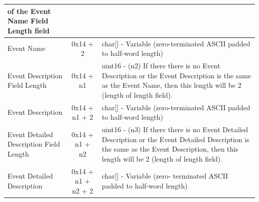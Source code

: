 \documentclass[14]{article}
\begin{document}
\begin{tabular}[l]{|p{5cm}|c|p{7cm}|}
                                   of the Event Name Field Length field \\
  \hline
  Event Name & 0x14 + 2 & char[] - Variable (zero-terminated ASCII padded to
                          half-word length) \\
  \hline
  Event Description Field Length & 0x14 + n1 & uint16 - (n2) If there there is no
                                               Event Description or the Event
                                               Description is the same as the
                                               Event Name, then this length
                                               will be 2 (length of length
                                               field). \\
  \hline
  Event Description & 0x14 + n1 + 2 & char[] - Variable (zero-terminated ASCII
                                      padded to half-word length) \\
  \hline
  Event Detailed Description Field Length & 0x14 + n1 + n2 & uint16 - (n3) If
                                                             there there is no
                                                             Event Detailed
                                                             Description or the
                                                             Event Detailed
                                                             Description is the
                                                             same as the Event
                                                             Description, then
                                                             this length will be
                                                             2 (length of length
                                                             field). \\
  \hline
  Event Detailed Description & 0x14 + n1 + n2 + 2 & char[] - Variable (zero-
                                                    terminated ASCII padded to
                                                    half-word length) \\
  \hline
\end{tabular}
\end{document}
